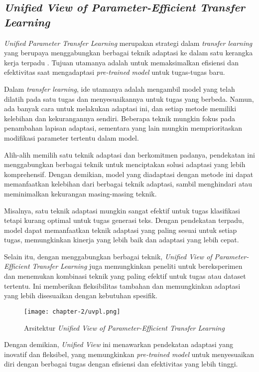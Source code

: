 \subsection{\textit{Unified View of Parameter-Efficient Transfer Learning}}

\textit{Unified Parameter Transfer Learning} merupakan strategi dalam \textit{transfer learning} yang berupaya menggabungkan berbagai teknik adaptasi ke dalam satu kerangka kerja terpadu \parencite{uvpl}. Tujuan utamanya adalah untuk memaksimalkan efisiensi dan efektivitas saat mengadaptasi \textit{pre-trained model} untuk tugas-tugas baru.

Dalam \textit{transfer learning}, ide utamanya adalah mengambil model yang telah dilatih pada satu tugas dan menyesuaikannya untuk tugas yang berbeda. Namun, ada banyak cara untuk melakukan adaptasi ini, dan setiap metode memiliki kelebihan dan kekurangannya sendiri. Beberapa teknik mungkin fokus pada penambahan lapisan adaptasi, sementara yang lain mungkin memprioritaskan modifikasi parameter tertentu dalam model.

Alih-alih memilih satu teknik adaptasi dan berkomitmen padanya, pendekatan ini menggabungkan berbagai teknik untuk menciptakan solusi adaptasi yang lebih komprehensif. Dengan demikian, model yang diadaptasi dengan metode ini dapat memanfaatkan kelebihan dari berbagai teknik adaptasi, sambil menghindari atau meminimalkan kekurangan masing-masing teknik.

Misalnya, satu teknik adaptasi mungkin sangat efektif untuk tugas klasifikasi tetapi kurang optimal untuk tugas generasi teks. Dengan pendekatan terpadu, model dapat memanfaatkan teknik adaptasi yang paling sesuai untuk setiap tugas, memungkinkan kinerja yang lebih baik dan adaptasi yang lebih cepat.

Selain itu, dengan menggabungkan berbagai teknik, \textit{Unified View of Parameter-Efficient Transfer Learning} juga memungkinkan peneliti untuk bereksperimen dan menemukan kombinasi teknik yang paling efektif untuk tugas atau dataset tertentu. Ini memberikan fleksibilitas tambahan dan memungkinkan adaptasi yang lebih disesuaikan dengan kebutuhan spesifik.

\begin{figure}[ht]
    \centering
    \texttt{[image: chapter-2/uvpl.png]}
    \caption{Arsitektur \textit{Unified View of Parameter-Efficient Transfer Learning}}
    \label{fig:uvpl}
\end{figure}

Dengan demikian, \textit{Unified View} ini menawarkan pendekatan adaptasi yang inovatif dan fleksibel, yang memungkinkan \textit{pre-trained model} untuk menyesuaikan diri dengan berbagai tugas dengan efisiensi dan efektivitas yang lebih tinggi.